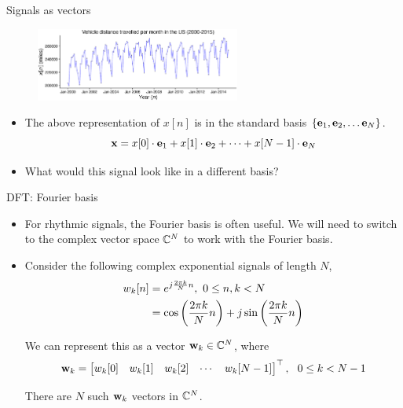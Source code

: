 \documentclass[aspectratio=169]{beamer}
\let\olditem\item
\renewcommand{\item}{\setlength{\itemsep}{\fill}\olditem}
\def\mf{\ensuremath\mathbf}
\def\mb{\ensuremath\mathbb}
\def\lp{\ensuremath\left(}
\def\rp{\ensuremath\right)}
\def\lc{\ensuremath\left\{}
\def\rc{\ensuremath\right\}}
\def\bmx{\ensuremath\begin{bmatrix*}[r]}
\def\emx{\ensuremath\end{bmatrix*}}
\begin{document}
\begin{frame}[t]{Signals as vectors}
  \begin{figure}[h]
    \includegraphics[width=0.6\textwidth]{figs/miles.eps}
  \end{figure}

  \begin{itemize}
    \item The above representation of $x[n]$ is in the standard basis $\lc \mf{e}_1, \mf{e}_2, \ldots \mf{e}_N\rc$.
    \[ \mf{x} = x[0] \cdot \mf{e}_1 + x[1] \cdot \mf{e}_2 + \cdots + x[N-1] \cdot \mf{e}_N \]

    \item What would this signal look like in a different basis?
  \end{itemize}
\end{frame}


\begin{frame}[t]{DFT: Fourier basis}
  \begin{itemize}
    \item For rhythmic signals, the Fourier basis is often useful. We will need to switch to the complex vector space $\mb{C}^N$ to work with the Fourier basis.
    
    \item Consider the following complex exponential signals of length $N$,
    \[
      \begin{split}
        w_k[n] &= e^{j \frac{2\pi k}{N}n}, \,\, 0 \leq n, k < N \\
               &= \cos\lp \frac{2\pi k}{N}n\rp + j \sin \lp \frac{2\pi k}{N}n\rp
      \end{split}
    \]

    We can represent this as a vector $\mf{w}_k \in \mb{C}^N$, where
    \[ \mf{w}_k = \bmx w_k[0] & w_k[1] & w_k[2] & \cdots & w_k[N-1] \emx^\top, \,\,\ 0 \leq k < N-1 \]
    
    There are $N$ such $\mf{w}_k$ vectors in $\mb{C}^N$.
  \end{itemize}
\end{frame}
\end{document}
